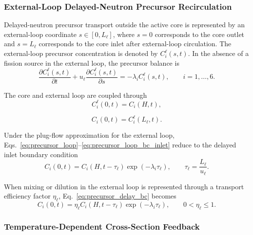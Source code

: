 \documentclass[a4paper,12pt]{article}
\begin{document}
\subsubsection{External-Loop Delayed-Neutron Precursor Recirculation}

Delayed-neutron precursor transport outside the active core is represented
by an external-loop coordinate $s \in [0,L_\ell]$, where $s=0$
corresponds to the core outlet and $s=L_\ell$ corresponds to the core
inlet after external-loop circulation. The external-loop precursor
concentration is denoted by $C_i^\ell(s,t)$. In the absence of a fission
source in the external loop, the precursor balance is
\begin{equation}
\frac{\partial C_i^\ell(s,t)}{\partial t}
+
u_\ell
\frac{\partial C_i^\ell(s,t)}{\partial s}
=
-
\lambda_i C_i^\ell(s,t),
\qquad
i=1,\ldots,6.
\label{eq:precursor_loop}
\end{equation}

The core and external loop are coupled through
\begin{equation}
C_i^\ell(0,t)=C_i(H,t),
\label{eq:precursor_loop_bc_outlet}
\end{equation}

\begin{equation}
C_i(0,t)=C_i^\ell(L_\ell,t).
\label{eq:precursor_loop_bc_inlet}
\end{equation}

Under the plug-flow approximation for the external loop,
Eqs.~\eqref{eq:precursor_loop}--\eqref{eq:precursor_loop_bc_inlet}
reduce to the delayed inlet boundary condition
\begin{equation}
C_i(0,t)
=
C_i(H,t-\tau_\ell)
\exp(-\lambda_i \tau_\ell),
\qquad
\tau_\ell=\frac{L_\ell}{u_\ell}.
\label{eq:precursor_delay_bc}
\end{equation}

When mixing or dilution in the external loop is represented through a
transport efficiency factor $\eta_\ell$, Eq.~\eqref{eq:precursor_delay_bc}
becomes
\begin{equation}
C_i(0,t)
=
\eta_\ell
C_i(H,t-\tau_\ell)
\exp(-\lambda_i \tau_\ell),
\qquad
0<\eta_\ell\leq 1.
\label{eq:precursor_delay_bc_eta}
\end{equation}

\subsubsection{Temperature-Dependent Cross-Section Feedback}
\end{document}
